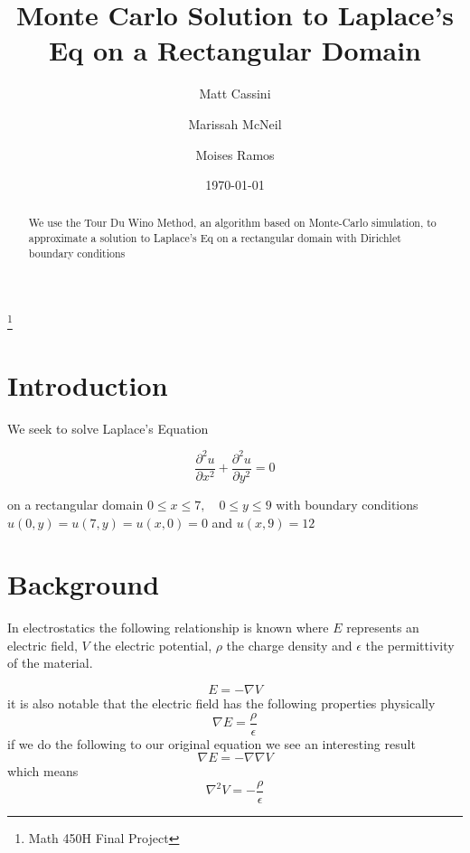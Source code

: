 \documentclass{amsart}
\begin{document}
	
\title{Monte Carlo Solution to Laplace's Eq on a Rectangular Domain}

\author{Matt Cassini}
\address{Department of Mathematical Sciences, New Jersey Institute of Technology, University Heights, Newark, NJ 07102}

\author{Marissah McNeil}
\address{Department of Mathematical Sciences, New Jersey Institute of Technology, University Heights, Newark, NJ 07102}

\author{Moises Ramos}
\address{Department of Mathematical Sciences, New Jersey Institute of Technology, University Heights, Newark, NJ 07102}

\thanks{Math 450H Final Project}
\begin{abstract}
	We use the Tour Du Wino Method, an algorithm based on Monte-Carlo simulation, to approximate a solution to Laplace's Eq on a rectangular domain with Dirichlet boundary conditions
\end{abstract}

\date{\today}
\maketitle



\section{Introduction}
We seek to solve Laplace's Equation

\begin{equation}
	\frac{\partial^2 u}{\partial x^2} + \frac{\partial^2 u}{\partial y^2} = 0
\end{equation}

on a rectangular domain $0 \leq x \leq 7, \quad 0 \leq y \leq 9$ with boundary conditions $u(0,y) = u(7,y) = u(x,0) = 0$ and $u(x,9) = 12$
\section{Background}

In electrostatics the following relationship is known where $E$ represents an electric field, $V$  the electric potential, $\rho$ the charge density and $\epsilon$ the permittivity of the material.

$$E=-\nabla V$$ it is also notable that the electric field has the following properties physically $$\nabla E= \frac{\rho}{\epsilon}$$ if we do the following to our original equation we see an interesting result $$\nabla E=- \nabla \nabla V$$ 
which means $$\nabla ^2 V=- \frac{\rho}{\epsilon}$$ 
\end{document}
